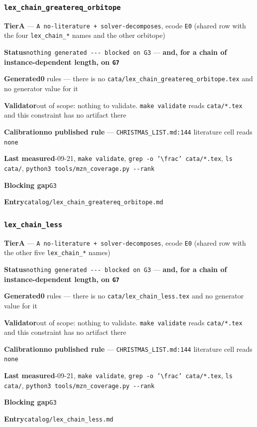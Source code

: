 \documentclass[10pt,a4paper]{article}
\newcommand{\entryfield}[2]{{\raggedright\textbf{#1}\quad #2\par}}
\begin{document}
\subsubsection*{\texttt{lex\_\allowbreak{}chain\_\allowbreak{}greatereq\_\allowbreak{}orbitope}}
\label{entry:lex-chain-greatereq-orbitope}
\entryfield{Tier}{\textbf{A} --- \texttt{A no-\allowbreak{}literature + solver-\allowbreak{}decomposes}, ecode \texttt{E0} (shared row with the four \texttt{lex\_chain\_*} names and the other orbitope)}
\entryfield{Status}{\texttt{nothing generated -\allowbreak{}-\allowbreak{}-\allowbreak{} blocked on G3} --- \textbf{and, for a chain of instance-dependent length, on \texttt{G7}}}
\entryfield{Generated}{\textbf{0} rules --- there is no \texttt{cata/\allowbreak{}lex\_\allowbreak{}chain\_\allowbreak{}greatereq\_\allowbreak{}orbitope.\allowbreak{}tex} and no generator value for it}
\entryfield{Validator}{out of scope: nothing to validate. \texttt{make validate} reads \texttt{cata/*.tex} and this constraint has no artifact there}
\entryfield{Calibration}{\textbf{no published rule} --- \texttt{CHRISTMAS\_LIST.md:144} literature cell reads \texttt{none}}
\entryfield{Last measured}{2026-09-21, \texttt{make validate}, \texttt{grep -\allowbreak{}o '\textbackslash{}frac' cata/\allowbreak{}*.\allowbreak{}tex}, \texttt{ls cata/}, \texttt{python3 tools/\allowbreak{}mzn\_\allowbreak{}coverage.\allowbreak{}py -\allowbreak{}-\allowbreak{}rank}}
\entryfield{Blocking gap}{\texttt{G3}}
\entryfield{Entry}{\texttt{catalog/lex\_chain\_greatereq\_orbitope.md}}
\subsubsection*{\texttt{lex\_\allowbreak{}chain\_\allowbreak{}less}}
\label{entry:lex-chain-less}
\entryfield{Tier}{\textbf{A} --- \texttt{A no-\allowbreak{}literature + solver-\allowbreak{}decomposes}, ecode \texttt{E0} (shared row with the other five \texttt{lex\_chain\_*} names)}
\entryfield{Status}{\texttt{nothing generated -\allowbreak{}-\allowbreak{}-\allowbreak{} blocked on G3} --- \textbf{and, for a chain of instance-dependent length, on \texttt{G7}}}
\entryfield{Generated}{\textbf{0} rules --- there is no \texttt{cata/lex\_chain\_less.tex} and no generator value for it}
\entryfield{Validator}{out of scope: nothing to validate. \texttt{make validate} reads \texttt{cata/*.tex} and this constraint has no artifact there}
\entryfield{Calibration}{\textbf{no published rule} --- \texttt{CHRISTMAS\_LIST.md:144} literature cell reads \texttt{none}}
\entryfield{Last measured}{2026-09-21, \texttt{make validate}, \texttt{grep -\allowbreak{}o '\textbackslash{}frac' cata/\allowbreak{}*.\allowbreak{}tex}, \texttt{ls cata/}, \texttt{python3 tools/\allowbreak{}mzn\_\allowbreak{}coverage.\allowbreak{}py -\allowbreak{}-\allowbreak{}rank}}
\entryfield{Blocking gap}{\texttt{G3}}
\entryfield{Entry}{\texttt{catalog/lex\_chain\_less.md}}
\end{document}
